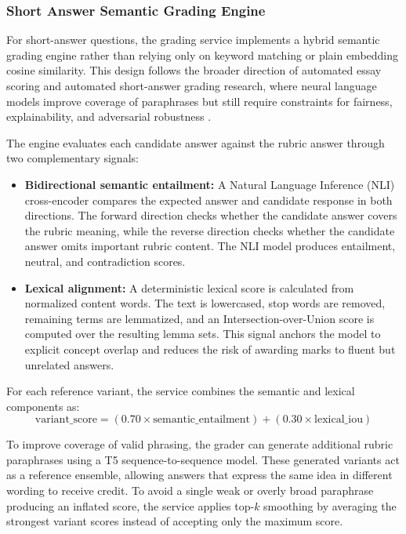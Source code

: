 \subsubsection{Short Answer Semantic Grading Engine}
For short-answer questions, the grading service implements a hybrid semantic grading engine rather than relying only on keyword matching or plain embedding cosine similarity. This design follows the broader direction of automated essay scoring and automated short-answer grading research, where neural language models improve coverage of paraphrases but still require constraints for fairness, explainability, and adversarial robustness \citep{Ramesh2022,Uto2021,Schneider2024}.

The engine evaluates each candidate answer against the rubric answer through two complementary signals:
\begin{itemize}
    \item \textbf{Bidirectional semantic entailment:} A Natural Language Inference (NLI) cross-encoder compares the expected answer and candidate response in both directions. The forward direction checks whether the candidate answer covers the rubric meaning, while the reverse direction checks whether the candidate answer omits important rubric content. The NLI model produces entailment, neutral, and contradiction scores.
    \item \textbf{Lexical alignment:} A deterministic lexical score is calculated from normalized content words. The text is lowercased, stop words are removed, remaining terms are lemmatized, and an Intersection-over-Union score is computed over the resulting lemma sets. This signal anchors the model to explicit concept overlap and reduces the risk of awarding marks to fluent but unrelated answers.
\end{itemize}

For each reference variant, the service combines the semantic and lexical components as:
\[
\text{variant\_score} =
(0.70 \times \text{semantic\_entailment}) +
(0.30 \times \text{lexical\_iou})
\]

To improve coverage of valid phrasing, the grader can generate additional rubric paraphrases using a T5 sequence-to-sequence model. These generated variants act as a reference ensemble, allowing answers that express the same idea in different wording to receive credit. To avoid a single weak or overly broad paraphrase producing an inflated score, the service applies top-\(k\) smoothing by averaging the strongest variant scores instead of accepting only the maximum score.

